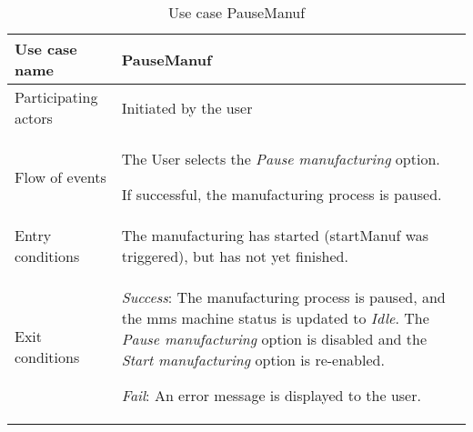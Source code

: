 \begin{table}
  \captionsetup{justification=raggedright, singlelinecheck=false}
  \caption{Use case PauseManuf}
  \centering
  \begin{tabular}{p{}p{}}
    \hline
    Use case name & \textbf{PauseManuf} \\ \hline
     Participating actors      & Initiated by the user \\ \hline
     Flow of events & \begin{enum-c}
     \item The User selects the \emph{Pause manufacturing} option.
     \item If successful, the manufacturing process is paused.
     \end{enum-c}\\ \hline 
     Entry conditions       & The manufacturing has started (startManuf was
     triggered), but has not yet finished. \\ \hline 
      Exit conditions & \begin{item-c}
      \item \emph{Success}: The manufacturing process is paused, and
        the \gls{mms} machine status is updated to \emph{Idle}. The \emph{Pause
        manufacturing} option is disabled and the \emph{Start manufacturing}
        option is re-enabled.
     \item \emph{Fail}: An error message is displayed to the user.
      \end{item-c}\\ \hline
  \end{tabular}
\label{tab:us-pause-manuf}
\end{table}

